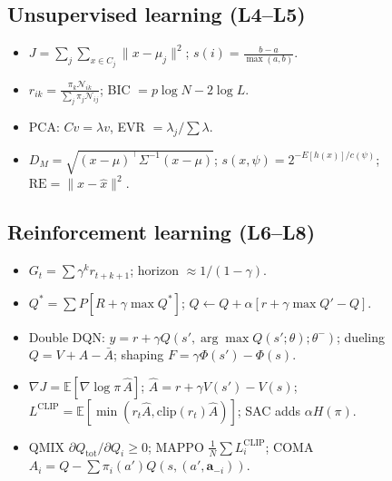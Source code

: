 \documentclass[11pt]{article}
\begin{document}
\subsection{Unsupervised learning (L4--L5)}
\begin{itemize}
\item $J=\sum_j\sum_{x\in C_j}\|x-\mu_j\|^2$; $s(i)=\frac{b-a}{\max(a,b)}$.
\item $r_{ik}=\frac{\pi_k\mathcal N_{ik}}{\sum_j\pi_j\mathcal N_{ij}}$; BIC $=p\log N-2\log L$.
\item PCA: $Cv=\lambda v$, EVR $=\lambda_j/\sum\lambda$.
\item $D_M=\sqrt{(x-\mu)^\top\Sigma^{-1}(x-\mu)}$; $s(x,\psi)=2^{-E[h(x)]/c(\psi)}$; $\text{RE}=\|x-\hat x\|^2$.
\end{itemize}
\subsection{Reinforcement learning (L6--L8)}
\begin{itemize}
\item $G_t=\sum\gamma^kr_{t+k+1}$; horizon $\approx1/(1-\gamma)$.
\item $Q^*=\sum P[R+\gamma\max Q^*]$; $Q\leftarrow Q+\alpha[r+\gamma\max Q'-Q]$.
\item Double DQN: $y=r+\gamma Q(s',\arg\max Q(s';\theta);\theta^-)$; dueling $Q=V+A-\bar A$; shaping $F=\gamma\Phi(s')-\Phi(s)$.
\item $\nabla J=\mathbb E[\nabla\log\pi\,\hat A]$; $\hat A=r+\gamma V(s')-V(s)$; $L^{\text{CLIP}}=\mathbb E[\min(r_t\hat A,\text{clip}(r_t)\hat A)]$; SAC adds $\alpha H(\pi)$.
\item QMIX $\partial Q_{\text{tot}}/\partial Q_i\ge0$; MAPPO $\frac1N\sum L_i^{\text{CLIP}}$; COMA $A_i=Q-\sum\pi_i(a')Q(s,(a',\mathbf a_{-i}))$.
\end{itemize}
\end{document}
